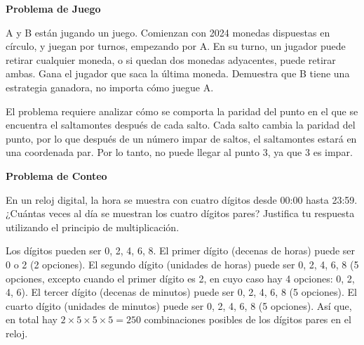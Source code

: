 \documentclass[11pt,paper=a4,answers,addpoints]{exam}
\begin{document}
\begin{questions}
\question[10] \textbf{Problema de Juego}

A y B están jugando un juego. Comienzan con 2024 monedas dispuestas en círculo, y juegan por turnos, empezando por A. En su turno, un jugador puede retirar cualquier moneda, o si quedan dos monedas adyacentes, puede retirar ambas. Gana el jugador que saca la última moneda. Demuestra que B tiene una estrategia ganadora, no importa cómo juegue A.


\begin{solution}
El problema requiere analizar cómo se comporta la paridad del punto en el que se encuentra el saltamontes después de cada salto. Cada salto cambia la paridad del punto, por lo que después de un número impar de saltos, el saltamontes estará en una coordenada par. Por lo tanto, no puede llegar al punto 3, ya que 3 es impar.
\end{solution}
\question[10] \textbf{Problema de Conteo}

En un reloj digital, la hora se muestra con cuatro dígitos desde 00:00 hasta 23:59. ¿Cuántas veces al día se muestran los cuatro dígitos pares? Justifica tu respuesta utilizando el principio de multiplicación.

\begin{solution}
Los dígitos pueden ser 0, 2, 4, 6, 8. El primer dígito (decenas de horas) puede ser 0 o 2 (2 opciones). El segundo dígito (unidades de horas) puede ser 0, 2, 4, 6, 8 (5 opciones, excepto cuando el primer dígito es 2, en cuyo caso hay 4 opciones: 0, 2, 4, 6). El tercer dígito (decenas de minutos) puede ser 0, 2, 4, 6, 8 (5 opciones). El cuarto dígito (unidades de minutos) puede ser 0, 2, 4, 6, 8 (5 opciones). Así que, en total hay \(2 \times 5 \times 5 \times 5 = 250\) combinaciones posibles de los dígitos pares en el reloj.
\end{solution}
\end{questions}
\end{document}

